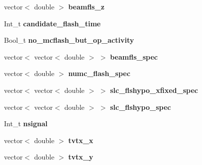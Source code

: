 \begin{DoxyCompactItemize}
\item 
\hypertarget{classUBXSecEvent_ac30df357368262d7a103ae9cd0bbd0d3}{vector$<$ double $>$ {\bfseries beamfls\-\_\-z}}\label{classUBXSecEvent_ac30df357368262d7a103ae9cd0bbd0d3}

\item 
\hypertarget{classUBXSecEvent_a84ab9cf932fabd0e1d9762ac07c75407}{Int\-\_\-t {\bfseries candidate\-\_\-flash\-\_\-time}}\label{classUBXSecEvent_a84ab9cf932fabd0e1d9762ac07c75407}

\item 
\hypertarget{classUBXSecEvent_a04fd3fd872cbe4f19ea0c438214ee854}{Bool\-\_\-t {\bfseries no\-\_\-mcflash\-\_\-but\-\_\-op\-\_\-activity}}\label{classUBXSecEvent_a04fd3fd872cbe4f19ea0c438214ee854}

\item 
\hypertarget{classUBXSecEvent_a672e817e5a574c0a1ff50ec81862bc1f}{vector$<$ vector$<$ double $>$ $>$ {\bfseries beamfls\-\_\-spec}}\label{classUBXSecEvent_a672e817e5a574c0a1ff50ec81862bc1f}

\item 
\hypertarget{classUBXSecEvent_aa51dba44fd0d9dcfbeb4c455b73debbd}{vector$<$ double $>$ {\bfseries numc\-\_\-flash\-\_\-spec}}\label{classUBXSecEvent_aa51dba44fd0d9dcfbeb4c455b73debbd}

\item 
\hypertarget{classUBXSecEvent_aff42f5975ca8b7c22f21023ffe8cf2c9}{vector$<$ vector$<$ double $>$ $>$ {\bfseries slc\-\_\-flshypo\-\_\-xfixed\-\_\-spec}}\label{classUBXSecEvent_aff42f5975ca8b7c22f21023ffe8cf2c9}

\item 
\hypertarget{classUBXSecEvent_aa82aa9b73994eae31d0f7ab0f47f23fa}{vector$<$ vector$<$ double $>$ $>$ {\bfseries slc\-\_\-flshypo\-\_\-spec}}\label{classUBXSecEvent_aa82aa9b73994eae31d0f7ab0f47f23fa}

\item 
\hypertarget{classUBXSecEvent_a6aff7f0ac0e26d4b80b117cb5797f1ab}{Int\-\_\-t {\bfseries nsignal}}\label{classUBXSecEvent_a6aff7f0ac0e26d4b80b117cb5797f1ab}

\item 
\hypertarget{classUBXSecEvent_a75b4a2318b7f7f187acdc33622a4795e}{vector$<$ double $>$ {\bfseries tvtx\-\_\-x}}\label{classUBXSecEvent_a75b4a2318b7f7f187acdc33622a4795e}

\item 
\hypertarget{classUBXSecEvent_aa6532549e8c9763ae285a98976a80a94}{vector$<$ double $>$ {\bfseries tvtx\-\_\-y}}\label{classUBXSecEvent_aa6532549e8c9763ae285a98976a80a94}


\end{DoxyCompactItemize}
